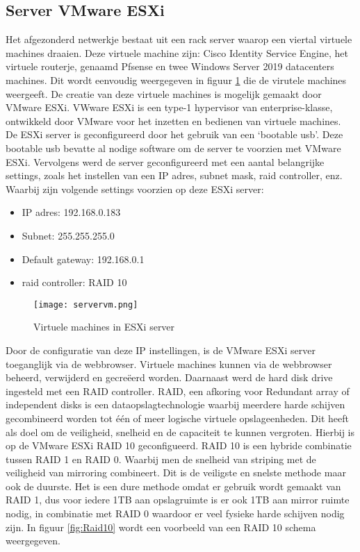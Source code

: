 \subsection{Server VMware ESXi}
Het afgezonderd netwerkje bestaat uit een rack server waarop een viertal virtuele machines draaien. Deze virtuele machine zijn: Cisco Identity Service Engine, het virtuele routerje, genaamd Pfsense en twee  Windows Server 2019 datacenters machines. Dit wordt eenvoudig weergegeven in figuur \ref{fig:vms} die de virutele machines weergeeft. De creatie van deze virtuele machines is mogelijk gemaakt door VMware ESXi. VWware ESXi is een type-1 hypervisor van enterprise-klasse, ontwikkeld door VMware voor het inzetten en bedienen van virtuele machines. 
\newline
\newline
De ESXi server is geconfigureerd door het gebruik van een ‘bootable usb’. Deze bootable usb bevatte al nodige software om de server te voorzien met VMware ESXi. Vervolgens werd de server geconfigureerd met een aantal belangrijke settings, zoals het instellen van een IP adres, subnet mask, raid controller, enz. Waarbij zijn volgende settings voorzien op deze ESXi server: 

\begin{itemize}
	\item IP adres: 192.168.0.183
	\item Subnet: 255.255.255.0
	\item Default gateway: 192.168.0.1
	\item raid controller: RAID 10
\end{itemize}

\begin{figure}[H]
	\centering
	\texttt{[image: servervm.png]}
	\caption{Virtuele machines in ESXi server}
	\label{fig:vms}
\end{figure}

\newpage
Door de configuratie van deze IP instellingen, is de VMware ESXi server toeganglijk via de webbrowser. Virtuele machines kunnen via de webbrowser beheerd, verwijderd en gecreëerd worden. Daarnaast werd de hard disk drive ingesteld met een RAID controller. RAID, een afkoring voor Redundant array of independent disks is een dataopslagtechnologie waarbij meerdere harde schijven gecombineerd worden tot één of meer logische virtuele opslageenheden. Dit heeft als doel om de veiligheid, snelheid en de capaciteit te kunnen vergroten. Hierbij is op de VMware ESXi RAID 10 geconfigueerd. RAID 10 is een hybride combinatie tussen RAID 1 en RAID 0. Waarbij men de snelheid van striping met de veiligheid van mirroring combineert. 
\newline
\newline
Dit is de veiligste en snelste methode maar ook de duurste. Het is een dure methode omdat er gebruik wordt gemaakt van RAID 1, dus voor iedere 1TB aan opslagruimte is er ook 1TB aan mirror ruimte nodig, in combinatie met RAID 0 waardoor er veel fysieke harde schijven nodig zijn. In figuur \ref{fig:Raid10} wordt een voorbeeld van een RAID 10 schema weergegeven.

